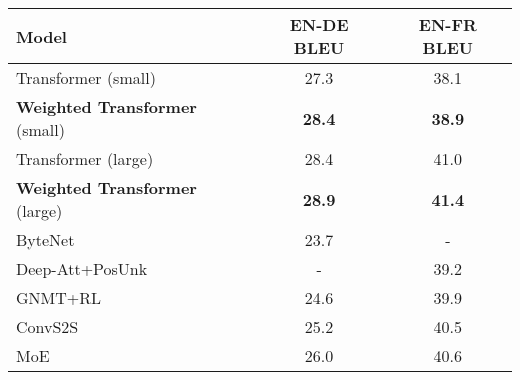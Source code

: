 \documentclass{article} \usepackage{iclr2018_conference,times}
\newcommand{\name}{Weighted Transformer\xspace}
\begin{document}
\begin{table*}
\center
\begin{tabular}{l|c|c}
\toprule
\bf Model & \bf EN-DE BLEU & \bf EN-FR BLEU \\
\midrule
Transformer (small)~\citep{vaswani2017attention} & 27.3 & 38.1\\ 
\textbf{\name} (small) & \textbf{28.4} & \textbf{38.9} \\  
\midrule
Transformer (large)~\citep{vaswani2017attention} & 28.4  & 41.0\\ 
\textbf{\name} (large) & \textbf{28.9} & \textbf{41.4} \\ 
\midrule
ByteNet~\citep{kalchbrenner2016neural} & 23.7 & - \\
Deep-Att+PosUnk~\citep{zhou2016deep} & - & 39.2 \\
GNMT+RL~\citep{wu2016google} & 24.6 & 39.9 \\
ConvS2S~\citep{gehring2017convs2s} & 25.2 & 40.5 \\
MoE~\citep{shazeer2017outrageously} & 26.0 & 40.6 \\
\bottomrule
\end{tabular}
\caption{
Experimental results on the WMT 2014 English-to-German (EN-DE) and English-to-French (EN-FR) translation tasks. Our proposed model outperforms the state-of-the-art models including the Transformer~\citep{vaswani2017attention}. The small model corresponds to configuration (A) in Table~\ref{table:model_variations} while large corresponds to configuration (B).
}
\label{table:results}
\end{table*}
\end{document}
